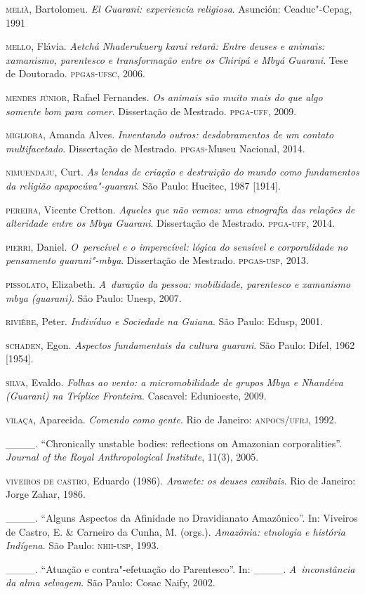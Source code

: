 \begin{Parskip}
\textsc{melià}, Bartolomeu. \emph{El Guarani: experiencia religiosa}. Asunción:
Ceaduc"-Cepag, 1991

\textsc{mello}, Flávia. \emph{Aetchá Nhaderukuery karai retarã: Entre
deuses e animais: xamanismo, parentesco e transformação entre os
Chiripá e Mbyá Guarani}. Tese de Doutorado. \textsc{ppgas}-\textsc{ufsc},
2006.

\textsc{mendes} \textsc{júnior}, Rafael Fernandes. \emph{Os animais são muito mais do que algo
somente bom para comer}. Dissertação de Mestrado. \textsc{ppga}-\textsc{uff},
2009.

\textsc{migliora}, Amanda Alves. \emph{Inventando outros: desdobramentos de um contato
multifacetado}. Dissertação de Mestrado. \textsc{ppgas}-Museu
Nacional, 2014.

\textsc{nimuendaju}, Curt. \emph{As lendas de criação e destruição do mundo como
fundamentos da religião apapocúva"-guarani}. São Paulo: Hucitec, 1987
[1914].

\textsc{pereira}, Vicente Cretton. \emph{Aqueles que não vemos: uma etnografia das
relações de alteridade entre os Mbya Guarani}. Dissertação de Mestrado.
\textsc{ppga}-\textsc{uff}, 2014.

\textsc{pierri}, Daniel. \emph{O~perecível e o imperecível: lógica do sensível
e corporalidade no pensamento guarani"-mbya}. Dissertação de Mestrado.
\textsc{ppgas}-\textsc{usp}, 2013.

\textsc{pissolato}, Elizabeth. \emph{A~duração da pessoa: mobilidade, parentesco e
xamanismo mbya (guarani)}. São Paulo: Unesp, 2007.

\textsc{rivière}, Peter. \emph{Indivíduo e Sociedade na Guiana}. São Paulo: Edusp, 2001.

\textsc{schaden}, Egon. \emph{Aspectos fundamentais da cultura guarani}. São Paulo:
Difel, 1962 [1954]. 

\textsc{silva}, Evaldo. \emph{Folhas ao vento: a micromobilidade de grupos
Mbya e Nhandéva (Guarani) na Tríplice Fronteira}. Cascavel: Edunioeste,
2009.

\textsc{vilaça}, Aparecida. \emph{Comendo como gente}. Rio de Janeiro: \textsc{anpocs}/\textsc{ufrj},
1992.

\_\_\_\_. ``Chronically unstable bodies: reflections on Amazonian
corporalities''. \emph{Journal of the Royal Anthropological Institute}, 11(3),
2005.

\textsc{viveiros de castro}, Eduardo (1986). \emph{Arawete: os deuses canibais}. Rio de
Janeiro: Jorge Zahar, 1986.

\_\_\_\_. ``Alguns Aspectos da Afinidade no Dravidianato Amazônico''. In:
Viveiros de Castro, E. \& Carneiro da Cunha, M. (orgs.).
\emph{Amazônia: etnologia e história Indígena}. São Paulo: \textsc{nhii}-\textsc{usp},
1993.

\_\_\_\_. ``Atuação e contra"-efetuação do Parentesco''. In: \_\_\_\_. \emph{A~inconstância da
alma selvagem}. São Paulo: Cosac Naify, 2002.
\end{Parskip}

